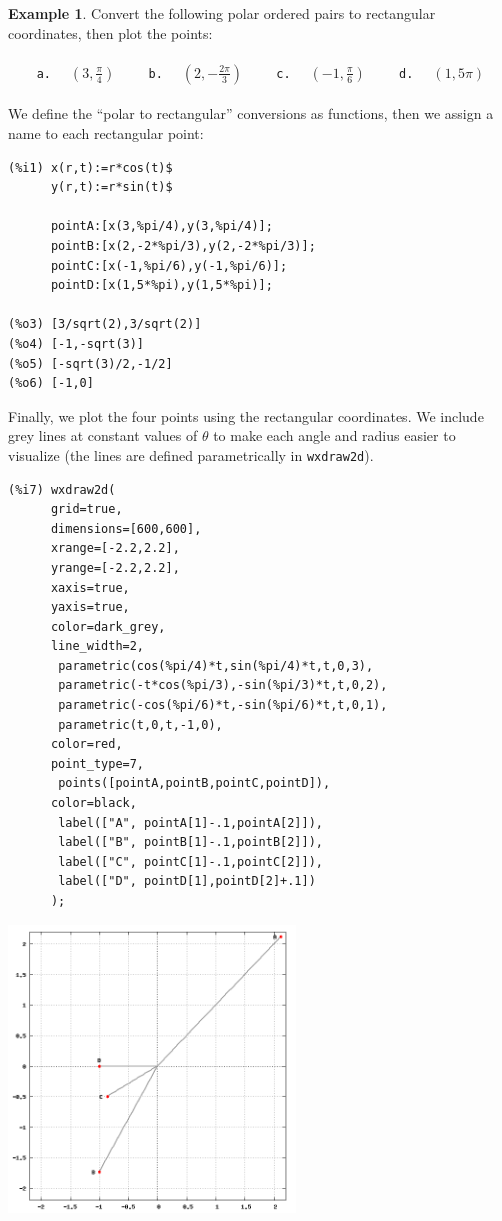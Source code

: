 \documentclass[10.5pt,twoside]{report}
\theoremstyle{definition}
\newtheorem{exmp}{Example}[section]
\begin{document}
\begin{exmp} Convert the following polar ordered pairs to rectangular coordinates, then plot the points:\\
${}$\\

\verb|    a.  | $\left(3,\frac{\pi}{4}\right)$  \verb|    b.  | $\left(2,-\frac{2\pi}{3}\right)$
\verb|    c.  | $\left(-1,\frac{\pi}{6}\right)$ \verb|    d.  | $\left(1,5\pi\right)$\\

${}$\\

We define the ``polar to rectangular'' conversions as functions, then we assign a name to each rectangular point:

\begin{verbatim}
(%i1) x(r,t):=r*cos(t)$
      y(r,t):=r*sin(t)$
      
      pointA:[x(3,%pi/4),y(3,%pi/4)];
      pointB:[x(2,-2*%pi/3),y(2,-2*%pi/3)];
      pointC:[x(-1,%pi/6),y(-1,%pi/6)];
      pointD:[x(1,5*%pi),y(1,5*%pi)];
      
(%o3) [3/sqrt(2),3/sqrt(2)]
(%o4) [-1,-sqrt(3)]
(%o5) [-sqrt(3)/2,-1/2]
(%o6) [-1,0]
\end{verbatim}

Finally, we plot the four points using the rectangular coordinates.  We include grey lines at constant values of $\theta$ to make each angle and radius easier to visualize (the lines are defined parametrically in \verb|wxdraw2d|).

\begin{verbatim}
(%i7) wxdraw2d(
      grid=true,
      dimensions=[600,600],
      xrange=[-2.2,2.2], 
      yrange=[-2.2,2.2],
      xaxis=true,
      yaxis=true,
      color=dark_grey,
      line_width=2,
       parametric(cos(%pi/4)*t,sin(%pi/4)*t,t,0,3),
       parametric(-t*cos(%pi/3),-sin(%pi/3)*t,t,0,2),
       parametric(-cos(%pi/6)*t,-sin(%pi/6)*t,t,0,1),
       parametric(t,0,t,-1,0),
      color=red,
      point_type=7,
       points([pointA,pointB,pointC,pointD]),
      color=black,
       label(["A", pointA[1]-.1,pointA[2]]),
       label(["B", pointB[1]-.1,pointB[2]]),
       label(["C", pointC[1]-.1,pointC[2]]),
       label(["D", pointD[1],pointD[2]+.1])
      );
\end{verbatim}

\includegraphics[width=3in]{example_5_3_1_1}


\end{exmp}
\end{document}
